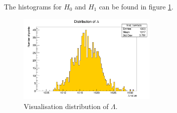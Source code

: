 \documentclass[10pt]{article}
\newenvironment{myfont}{\fontfamily{put}\selectfont}{\par}
\begin{document}
\begin{myfont}
\noindent The histograms for $H_{0}$ and $H_{1}$ can be found in figure \ref{fig:ex9_lambda}.

\begin{figure}[H]
  \centering
  \includegraphics[width = 0.6\textwidth]{./exercise09_Lambda.png}
  \caption{Visualisation distribution of $\Lambda$.}
  \label{fig:ex9_lambda}
\end{figure}

\end{myfont}
\end{document}
